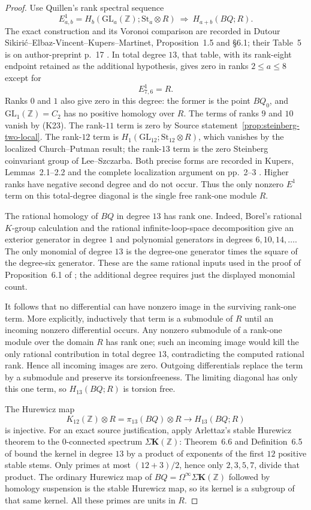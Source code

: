 \begin{proof}
Use Quillen's rank spectral sequence
\[
 E^1_{a,b}=H_b(\mathrm{GL}_a(\mathbb Z);\mathrm{St}_a\otimes R)
 \ \Longrightarrow\ H_{a+b}(BQ;R).
\]
The exact construction and its Voronoi comparison are recorded in
Dutour Sikiri\'c--Elbaz-Vincent--Kupers--Martinet,
Proposition~1.5 and \S6.1; their Table~5 is on author-preprint p.~17
\cite{DEKM2026}. In total degree $13$, that table, with its rank-eight endpoint retained
as the additional hypothesis, gives zero in ranks $2\le a\le8$ except for
\[
 E^1_{7,6}=R.
\]
Ranks $0$ and $1$ also give zero in this degree: the former is the
point $BQ_0$, and $\mathrm{GL}_1(\mathbb Z)=C_2$ has no positive
homology over $R$. The terms of ranks $9$ and $10$ vanish by (K23). The rank-$11$
term is zero by Source statement~\ref{prop:steinberg-two-local}.
The rank-$12$ term is $H_1(\mathrm{GL}_{12};\mathrm{St}_{12}\otimes R)$,
which vanishes by the localized Church--Putman result; the rank-$13$
term is the zero Steinberg coinvariant group of Lee--Szczarba.
Both precise forms are recorded in Kupers, Lemmas~2.1--2.2 and the
complete localization argument on pp.~2--3
\cite{Kupers2019}. Higher ranks have negative second degree and do
not occur. Thus the only nonzero $E^1$ term on this total-degree
diagonal is the single free rank-one module $R$.

The rational homology of $BQ$ in degree $13$ has rank one.
Indeed, Borel's rational $K$-group calculation and the rational
infinite-loop-space decomposition give an exterior generator in
degree $1$ and polynomial generators in degrees $6,10,14,\ldots$.
The only monomial of degree $13$ is the degree-one generator times
the square of the degree-six generator. These are the same rational
inputs used in the proof of Proposition~6.1 of
\cite{DEKM2026}; the additional degree requires just the
displayed monomial count.

It follows that no differential can have nonzero image in the
surviving rank-one term. More explicitly, inductively that term is
a submodule of $R$ until an incoming nonzero differential occurs.
Any nonzero submodule of a rank-one module over the domain $R$ has
rank one; such an incoming image would kill the only rational
contribution in total degree $13$, contradicting the computed
rational rank. Hence all incoming images are zero. Outgoing
differentials replace the term by a submodule and preserve its
torsionfreeness. The limiting diagonal has only this one term, so
$H_{13}(BQ;R)$ is torsion free.

The Hurewicz map
\[
 K_{12}(\mathbb Z)\otimes R
   =\pi_{13}(BQ)\otimes R\longrightarrow H_{13}(BQ;R)
\]
is injective. For an exact source justification, apply Arlettaz's
stable Hurewicz theorem to the $0$-connected spectrum
$\Sigma\mathbf K(\mathbb Z)$: Theorem~6.6 and Definition~6.5 of
\cite[pp.~40--42]{Arlettaz2000} bound the kernel in degree $13$
by a product of exponents of the first $12$ positive stable stems.
Only primes at most $(12+3)/2$, hence only $2,3,5,7$, divide that
product. The ordinary Hurewicz map of
$BQ=\Omega^\infty\Sigma\mathbf K(\mathbb Z)$ followed by homology
suspension is the stable Hurewicz map, so its kernel is a subgroup
of that same kernel. All these primes are units in $R$.


\end{proof}
